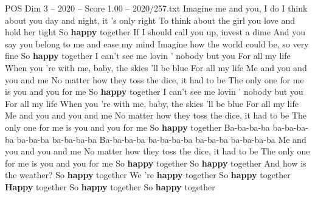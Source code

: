 \begin{textsample}{POS Dim 3 – 2020 – Score 1.00 – 2020/257.txt}  \label{ex:f3_pos_019}
Imagine me and you, I do I think about you day and night, it 's only right To think about the girl you love and hold her tight So \textbf{happy} together If I should call you up, invest a dime And you say you belong to me and ease my mind Imagine how the world could be, so very fine So \textbf{happy} together I can't see me lovin ' nobody but you For all my life When you 're with me, baby, the skies 'll be blue For all my life Me and you and you and me No matter how they toss the dice, it had to be The only one for me is you and you for me So \textbf{happy} together I can't see me lovin ' nobody but you For all my life When you 're with me, baby, the skies 'll be blue For all my life Me and you and you and me No matter how they toss the dice, it had to be The only one for me is you and you for me So \textbf{happy} together Ba-ba-ba-ba ba-ba-ba-ba ba-ba-ba ba-ba-ba-ba Ba-ba-ba-ba ba-ba-ba-ba ba-ba-ba ba-ba-ba-ba Me and you and you and me No matter how they toss the dice, it had to be The only one for me is you and you for me So \textbf{happy} together So \textbf{happy} together And how is the weather?
So \textbf{happy} together We 're \textbf{happy} together So \textbf{happy} together \textbf{Happy} together So \textbf{happy} together So \textbf{happy} together

\end{textsample}
